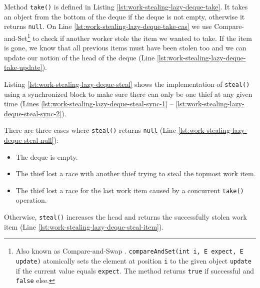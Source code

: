 

\VerbatimFootnotes Method \lstinline!take()! is defined in Listing
\ref{lst:work-stealing-lazy-deque-take}. It takes an object from the
bottom of the deque if the deque is not empty, otherwise it returns
\lstinline!null!. On Line \ref{lst:work-stealing-lazy-deque-take-cas}
we use Compare-and-Set\footnote{Also known as Compare-and-Swap
  \cite{IBM1974}. \verb!compareAndSet(int i, E expect, E update)!
  atomically sets the element at position \verb!i! to the given object
  \verb!update! if the current value equals \verb!expect!. The method
  returns \verb!true! if successful and \verb!false! else.} to check
if another worker stole the item we wanted to take. If the item is
gone, we know that all previous items must have been stolen too and we
can update our notion of the head of the deque (Line
\ref{lst:work-stealing-lazy-deque-take-update}).



Listing \ref{lst:work-stealing-lazy-deque-steal} shows the
implementation of \lstinline!steal()! using a synchronized block to
make sure there can only be one thief at any given time (Lines
\ref{lst:work-stealing-lazy-deque-steal-sync-1} --
\ref{lst:work-stealing-lazy-deque-steal-sync-2}). 

There are three cases where \lstinline!steal()! returns
\lstinline!null! (Line \ref{lst:work-stealing-lazy-deque-steal-null}):

\begin{itemize}
\item The deque is empty.
\item The thief lost a race with another thief trying to steal the
  topmost work item.
\item The thief lost a race for the last work item caused by a
  concurrent \lstinline!take()! operation.
\end{itemize}

Otherwise, \lstinline!steal()! increases the head and returns the
successfully stolen work item (Line
\ref{lst:work-stealing-lazy-deque-steal-item}).




